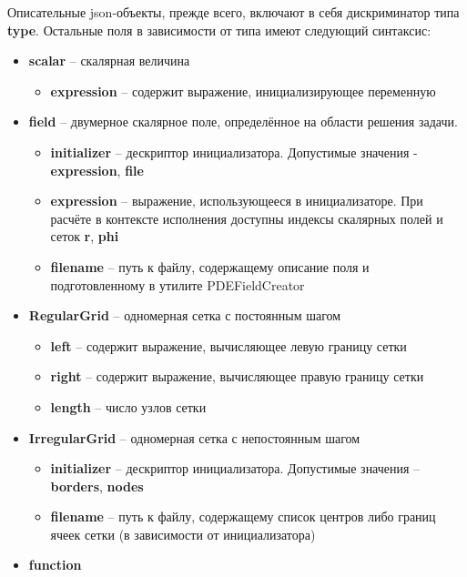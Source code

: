 Описательные json-объекты, прежде всего, включают в себя дискриминатор типа 
\textbf{type}. 
Остальные поля в зависимости от типа имеют следующий синтаксис:
\begin{itemize}
    \item \textbf{scalar} -- скалярная величина
    \begin{itemize}
        \item \textbf{expression} -- содержит выражение, инициализирующее 
        переменную
    \end{itemize}
    \item \textbf{field} -- двумерное скалярное поле, определённое на области 
    решения задачи.
    \begin{itemize}
        \item \textbf{initializer} -- дескриптор инициализатора. Допустимые 
        значения - \textbf{expression}, \textbf{file}
        \item \textbf{expression} -- выражение, использующееся в 
        инициализаторе. При расчёте в контексте исполнения доступны индексы 
        скалярных полей и сеток \textbf{r}, \textbf{phi}
        \item \textbf{filename} -- путь к файлу, содержащему описание поля и 
        подготовленному в утилите PDEFieldCreator
    \end{itemize}
    \item \textbf{RegularGrid} -- одномерная сетка с постоянным шагом
    \begin{itemize}
        \item \textbf{left} -- содержит выражение, вычисляющее левую границу 
        сетки
        \item \textbf{right} -- содержит выражение, вычисляющее правую границу 
        сетки
        \item \textbf{length} -- число узлов сетки
    \end{itemize}
    \item \textbf{IrregularGrid} -- одномерная сетка с непостоянным шагом
    \begin{itemize}
        \item \textbf{initializer} -- дескриптор инициализатора. Допустимые 
        значения -- \textbf{borders}, \textbf{nodes}
        \item \textbf{filename} -- путь к файлу, содержащему список центров 
        либо границ ячеек сетки (в зависимости от инициализатора)
    \end{itemize}
    \item \textbf{function}

\end{itemize}
